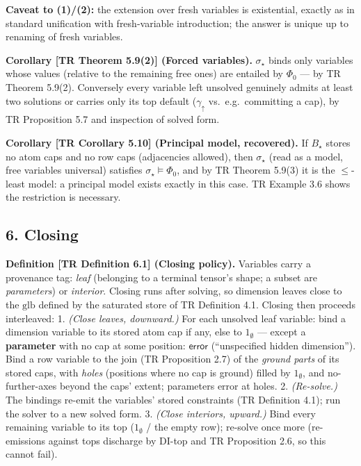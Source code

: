 \documentclass[
  10pt,
  letterpaper,
]{article}
\begin{document}
\textbf{Caveat to (1)/(2):} the extension over fresh variables is
existential, exactly as in standard unification with fresh-variable
introduction; the answer is unique up to renaming of fresh variables.

\textbf{Corollary {[}TR Theorem 5.9(2){]} (Forced variables).}
\(\sigma_\star\) binds only variables whose values (relative to the
remaining free ones) are entailed by \(\Phi_0\) --- by TR Theorem
5.9(2). Conversely every variable left unsolved genuinely admits at
least two solutions or carries only its top default (\(\gamma_\uparrow\)
vs.~e.g.~committing a cap), by TR Proposition 5.7 and inspection of
solved form.

\textbf{Corollary {[}TR Corollary 5.10{]} (Principal model, recovered).}
If \(B_\star\) stores no atom caps and no row caps (adjacencies
allowed), then \(\sigma_\star\) (read as a model, free variables
universal) satisfies \(\sigma_\star \models \Phi_0\), and by TR Theorem
5.9(3) it is the \(\le\)-least model: a principal model exists exactly
in this case. TR Example 3.6 shows the restriction is necessary.

\subsection{6. Closing}\label{closing}

\textbf{Definition {[}TR Definition 6.1{]} (Closing policy).} Variables
carry a provenance tag: \emph{leaf} (belonging to a terminal tensor's
shape; a subset are \emph{parameters}) or \emph{interior}. Closing runs
after solving, so dimension leaves close to the \(\mathrm{glb}\) defined
by the saturated store of TR Definition 4.1. Closing then proceeds
interleaved: 1. \emph{(Close leaves, downward.)} For each unsolved leaf
variable: bind a dimension variable to its stored atom cap if any, else
to \(1_\emptyset\) --- except a \textbf{parameter} with no cap at some
position: \(\mathsf{error}\) (``unspecified hidden dimension''). Bind a
row variable to the join (TR Proposition 2.7) of the \emph{ground parts}
of its stored caps, with \emph{holes} (positions where no cap is ground)
filled by \(1_\emptyset\), and no-further-axes beyond the caps' extent;
parameters error at holes. 2. \emph{(Re-solve.)} The bindings re-emit
the variables' stored constraints (TR Definition 4.1); run the solver to
a new solved form. 3. \emph{(Close interiors, upward.)} Bind every
remaining variable to its top (\(1_\emptyset\) / the empty row);
re-solve once more (re-emissions against tops discharge by DI-top and TR
Proposition 2.6, so this cannot fail).
\end{document}

